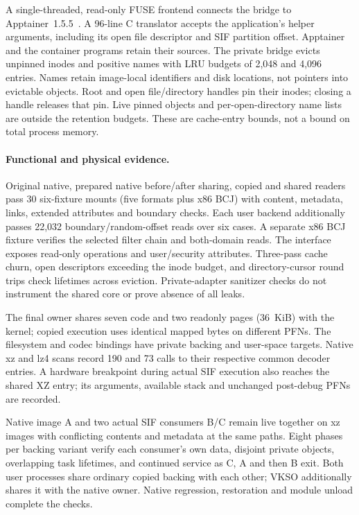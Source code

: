 A single-threaded, read-only FUSE frontend connects the bridge to
Apptainer~1.5.5~\cite{ev_apptainer155}. A 96-line C translator accepts the
application's helper arguments, including its open file descriptor and SIF
partition offset. Apptainer and the container programs retain their sources.
The private bridge evicts unpinned inodes and positive names with LRU budgets
of 2,048 and 4,096 entries. Names retain image-local identifiers and disk
locations, not pointers into evictable objects. Root and open file/directory
handles pin their inodes; closing a handle releases that pin. Live pinned
objects and per-open-directory name lists are outside the retention budgets.
These are cache-entry bounds, not a bound on total process memory.

\paragraph{Functional and physical evidence.}
Original native, prepared native before/after sharing, copied and shared
readers pass 30 six-fixture mounts (five formats plus x86 BCJ) with content, metadata, links, extended
attributes and boundary checks. Each user backend additionally passes
22,032 boundary/random-offset reads over six cases. A separate x86 BCJ
fixture verifies the selected filter chain and both-domain reads.
The interface exposes read-only operations and user/security attributes.
Three-pass cache churn, open descriptors exceeding the inode budget, and
directory-cursor round trips check lifetimes across eviction. Private-adapter
sanitizer checks do not instrument the shared core or prove absence of all leaks.

The final owner shares seven code and two readonly pages (36~KiB) with
the kernel; copied execution uses identical mapped bytes on different PFNs.
The filesystem and codec bindings have private backing and user-space
targets. Native xz and lz4 scans record 190 and 73 calls to their respective
common decoder entries. A hardware breakpoint during actual SIF execution
also reaches the shared XZ entry; its arguments, available stack and
unchanged post-debug PFNs are recorded.

Native image A and two actual SIF consumers B/C remain live together on xz
images with conflicting contents and metadata at the same paths. Eight
phases per backing variant verify each consumer's own data, disjoint private
objects, overlapping task lifetimes, and continued service as C, A and then B
exit. Both user processes share ordinary copied backing with each other;
VKSO additionally shares it with the native owner. Native regression,
restoration and module unload complete the checks.

